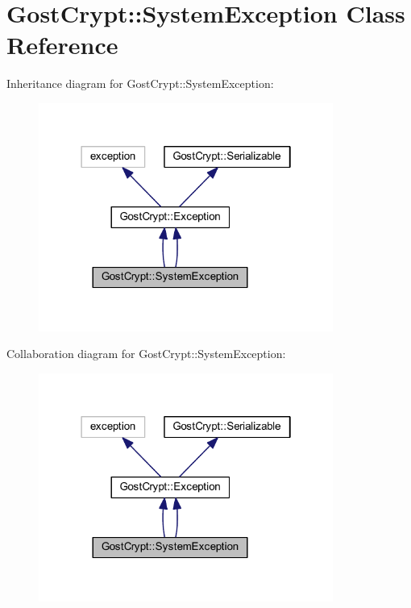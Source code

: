 \hypertarget{struct_gost_crypt_1_1_system_exception}{}\section{Gost\+Crypt\+:\+:System\+Exception Class Reference}
\label{struct_gost_crypt_1_1_system_exception}


Inheritance diagram for Gost\+Crypt\+:\+:System\+Exception\+:
\nopagebreak
\begin{figure}[H]
\begin{center}
\leavevmode
\includegraphics[width=274pt]{struct_gost_crypt_1_1_system_exception__inherit__graph}
\end{center}
\end{figure}


Collaboration diagram for Gost\+Crypt\+:\+:System\+Exception\+:
\nopagebreak
\begin{figure}[H]
\begin{center}
\leavevmode
\includegraphics[width=274pt]{struct_gost_crypt_1_1_system_exception__coll__graph}
\end{center}
\end{figure}
